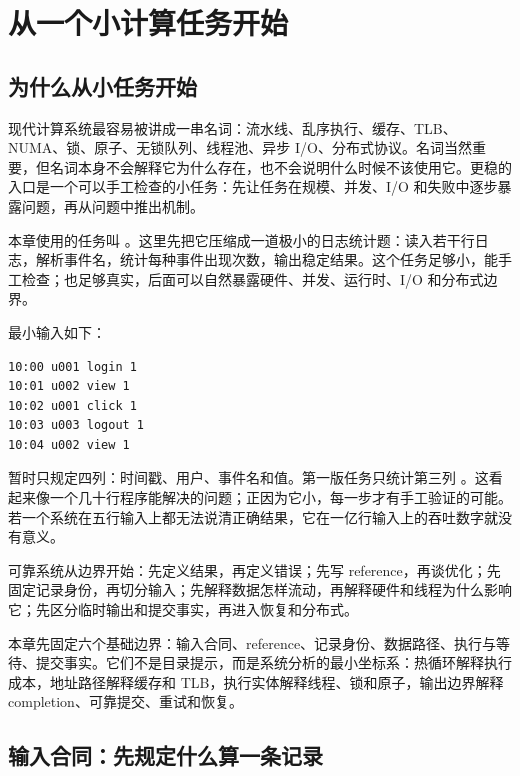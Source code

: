 \chapter{从一个小计算任务开始}

\section{为什么从小任务开始}

现代计算系统最容易被讲成一串名词：流水线、乱序执行、缓存、TLB、NUMA、锁、原子、无锁队列、线程池、异步 I/O、分布式协议。名词当然重要，但名词本身不会解释它为什么存在，也不会说明什么时候不该使用它。更稳的入口是一个可以手工检查的小任务：先让任务在规模、并发、I/O 和失败中逐步暴露问题，再从问题中推出机制。

本章使用的任务叫 。这里先把它压缩成一道极小的日志统计题：读入若干行日志，解析事件名，统计每种事件出现次数，输出稳定结果。这个任务足够小，能手工检查；也足够真实，后面可以自然暴露硬件、并发、运行时、I/O 和分布式边界。

最小输入如下：

\begin{lstlisting}[numbers=none,caption={五行日志输入}]
10:00 u001 login 1
10:01 u002 view 1
10:02 u001 click 1
10:03 u003 logout 1
10:04 u002 view 1
\end{lstlisting}

暂时只规定四列：时间戳、用户、事件名和值。第一版任务只统计第三列 。这看起来像一个几十行程序能解决的问题；正因为它小，每一步才有手工验证的可能。若一个系统在五行输入上都无法说清正确结果，它在一亿行输入上的吞吐数字就没有意义。

\begin{keyidea}
可靠系统从边界开始：先定义结果，再定义错误；先写 reference，再谈优化；先固定记录身份，再切分输入；先解释数据怎样流动，再解释硬件和线程为什么影响它；先区分临时输出和提交事实，再进入恢复和分布式。
\end{keyidea}

本章先固定六个基础边界：输入合同、reference、记录身份、数据路径、执行与等待、提交事实。它们不是目录提示，而是系统分析的最小坐标系：热循环解释执行成本，地址路径解释缓存和 TLB，执行实体解释线程、锁和原子，输出边界解释 completion、可靠提交、重试和恢复。

\section{输入合同：先规定什么算一条记录}

